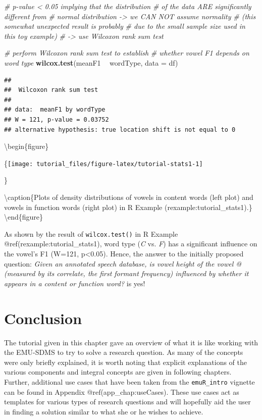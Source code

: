 \documentclass[]{book}
\newenvironment{Shaded}{\begin{snugshade}}{\end{snugshade}}
\newcommand{\CommentTok}[1]{\textcolor[rgb]{0.56,0.35,0.01}{\textit{#1}}}
\newcommand{\DataTypeTok}[1]{\textcolor[rgb]{0.13,0.29,0.53}{#1}}
\newcommand{\KeywordTok}[1]{\textcolor[rgb]{0.13,0.29,0.53}{\textbf{#1}}}
\newcommand{\NormalTok}[1]{#1}
\newcommand{\OperatorTok}[1]{\textcolor[rgb]{0.81,0.36,0.00}{\textbf{#1}}}
\newcommand{\StringTok}[1]{\textcolor[rgb]{0.31,0.60,0.02}{#1}}
\theoremstyle{definition}
\theoremstyle{definition}
\theoremstyle{definition}
\theoremstyle{remark}
\begin{document}
\begin{Shaded}
\begin{Highlighting}[]
\CommentTok{# p-value < 0.05 implying that the distribution}
\CommentTok{# of the data ARE significantly different from}
\CommentTok{# normal distribution -> we CAN NOT assume normality}
\CommentTok{# (this somewhat unexpected result is probably}
\CommentTok{# due to the small sample size used in this toy example)}
\CommentTok{# -> use Wilcoxon rank sum test}

\CommentTok{# perform Wilcoxon rank sum test to establish}
\CommentTok{# whether vowel F1 depends on word type}
\KeywordTok{wilcox.test}\NormalTok{(meanF1 }\OperatorTok{~}\StringTok{ }\NormalTok{wordType, }\DataTypeTok{data =}\NormalTok{ df)}
\end{Highlighting}
\end{Shaded}

\begin{verbatim}
## 
##  Wilcoxon rank sum test
## 
## data:  meanF1 by wordType
## W = 121, p-value = 0.03752
## alternative hypothesis: true location shift is not equal to 0
\end{verbatim}

\textbackslash{}begin\{figure\}

\{\centering \texttt{[image: tutorial\_files/figure-latex/tutorial-stats1-1]}

\}

\textbackslash{}caption\{Plots of density distributions of vowels in
content words (left plot) and vowels in function words (right plot) in R
Example \citet{ref}(rexample:tutorial\_stats1).\}\label{fig:tutorial-stats1}
\textbackslash{}end\{figure\}

As shown by the result of \texttt{wilcox.test()} in R Example
@ref(rexample:tutorial\_stats1), word type (\emph{C} vs. \emph{F}) has a
significant influence on the vowel's F1 (W=121, p\textless{}0.05).
Hence, the answer to the initially proposed question: \emph{Given an
annotated speech database, is vowel height of the vowel @ (measured by
its correlate, the first formant frequency) influenced by whether it
appears in a content or function word?} is yes!

\hypertarget{conclusion}{%
\section{Conclusion}\label{conclusion}}

The tutorial given in this chapter gave an overview of what it is like
working with the EMU-SDMS to try to solve a research question. As many
of the concepts were only briefly explained, it is worth noting that
explicit explanations of the various components and integral concepts
are given in following chapters. Further, additional use cases that have
been taken from the \texttt{emuR\_intro} vignette can be found in
Appendix @ref(app\_chap:useCases). These use cases act as templates for
various types of research questions and will hopefully aid the user in
finding a solution similar to what she or he wishes to achieve.
\end{document}
